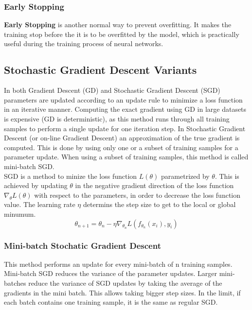     \subsubsection{Early Stopping}
    \textbf{Early Stopping} is another normal way to prevent overfitting. 
    It makes the training stop before the it is to be overfitted by the model, which is practically useful during the training process of neural networks.


    \subsection{Stochastic Gradient Descent Variants}
    \label{sgd}
    In both Gradient Descent (GD) and Stochastic Gradient Descent (SGD) parameters are updated according to an update rule to minimize a loss function in an iterative manner. Computing the exact gradient using GD in large datasets is expensive (GD is deterministic), as this method runs through all training samples to perform a single update for one iteration step. In Stochastic Gradient Descent (or on-line Gradient Descent) an approximation of the true gradient is computed. This is done by using only one or a subset of training samples for a parameter update. When using a subset of training samples, this method is called mini-batch SGD. \\

    SGD is a method to minize the loss function \(L(\theta)\)  parametrized by $\theta$. This is achieved by updating $\theta$ in the negative gradient direction of the loss function $\nabla_{\theta}L(\theta)$ with respect to the parameters, in order to decrease the loss function value. The learning rate $\eta$ determins the step size to get to the local or global minumum. 
    \begin{equation}
        \theta_{n+1} = \theta_{n} - \eta \nabla_{\theta_{n}}L(f_{\theta_{n}}(x_i), y_i)
    \end{equation}

    \subsubsection{Mini-batch Stochatic Gradient Descent}
    This method performs an update for every mini-batch of n training samples. Mini-batch SGD reduces the variance of the parameter updates. Larger mini-batches reduce the variance of SGD updates by taking the average of the gradients in the mini batch. This allows taking bigger step sizes. In the limit, if each batch contains one training sample, it is the same as regular SGD.

